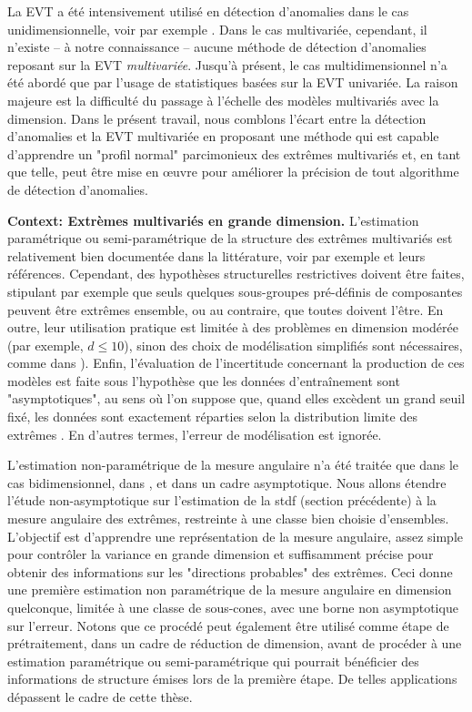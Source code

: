 La EVT a été intensivement utilisé en détection d'anomalies dans le cas unidimensionnelle, voir par exemple \cite{Roberts99, Roberts2000, Clifton2011, Clifton2008, Lee2008}. Dans le cas multivariée, cependant, il n'existe -- à notre connaissance -- aucune méthode de détection d'anomalies reposant sur la EVT \textit {multivariée}. Jusqu'à présent, le cas multidimensionnel n'a été abordé que par l'usage de statistiques basées sur la EVT univariée. La raison majeure est la difficulté du passage à l'échelle des modèles multivariés avec la dimension. Dans le présent travail, nous comblons l'écart entre la détection d'anomalies et la EVT multivariée en proposant une méthode qui est capable d'apprendre un "profil normal" parcimonieux des extrêmes multivariés et, en tant que telle, peut être mise en œuvre pour améliorer la précision de tout algorithme de détection d'anomalies.


\textbf{Context: Extrèmes multivariés en grande dimension.}
L'estimation paramétrique ou semi-paramétrique de la structure des extrêmes multivariés est relativement bien documentée dans la littérature, voir par exemple
\cite{coles1991modeling,fougeres2009models,cooley2010pairwise,sabourinNaveau2012} 
et leurs références. Cependant, des hypothèses structurelles restrictives doivent être faites, stipulant par exemple que seuls quelques sous-groupes pré-définis de composantes peuvent être extrêmes ensemble, ou au contraire, que toutes doivent l'être. En outre, leur utilisation pratique est limitée à des problèmes en dimension modérée (par exemple, $ d \le 10 $), sinon des choix de modélisation simplifiés sont nécessaires, comme dans \cite {stephenson2009high}). Enfin, l'évaluation de l'incertitude concernant la production de ces modèles est faite sous l'hypothèse que les données d'entraînement sont "asymptotiques", au sens où l'on suppose que, quand elles excèdent un grand seuil fixé, les données sont exactement réparties selon la distribution limite des extrêmes . En d'autres termes, l'erreur de modélisation est ignorée.


L'estimation non-paramétrique de la mesure angulaire n'a été traitée que dans le cas bidimensionnel, dans \cite{Einmahl2001, Einmahl2009}, et dans un cadre asymptotique. Nous allons étendre l'étude non-asymptotique sur l'estimation de la {\sc stdf} (section précédente) à la mesure angulaire des extrêmes, restreinte à une classe bien choisie d'ensembles. L'objectif est d'apprendre une représentation de la mesure angulaire, assez simple pour contrôler la variance en grande dimension et suffisamment précise pour obtenir des informations sur les "directions probables" des extrêmes. Ceci donne une première estimation non paramétrique de la mesure angulaire en dimension quelconque, limitée à une classe de sous-cones, avec une borne non asymptotique sur l'erreur.
Notons que ce procédé peut également être utilisé comme étape de prétraitement, dans un cadre de réduction de  dimension, avant de procéder à une estimation paramétrique ou semi-paramétrique qui pourrait bénéficier des informations de structure émises lors de la première étape. De telles applications dépassent le cadre de cette thèse.

